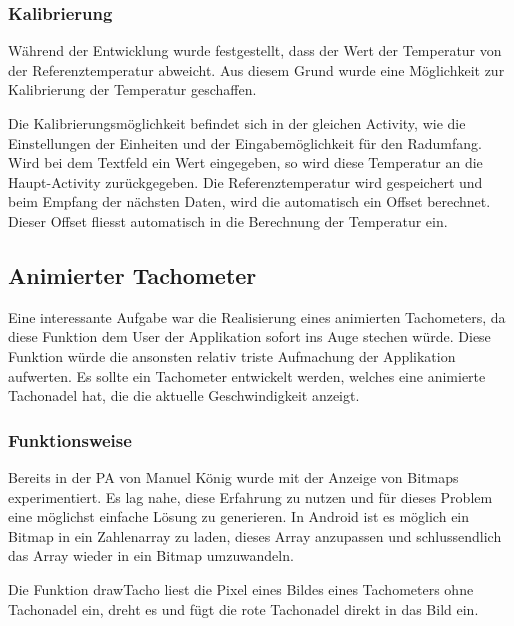 \subsubsection{Kalibrierung}

Während der Entwicklung wurde festgestellt, dass der Wert der Temperatur von der Referenztemperatur abweicht. Aus diesem Grund wurde eine Möglichkeit zur Kalibrierung der Temperatur geschaffen.

Die Kalibrierungsmöglichkeit befindet sich in der gleichen Activity, wie die Einstellungen der Einheiten und der Eingabemöglichkeit für den Radumfang. Wird bei dem Textfeld ein Wert eingegeben, so wird diese Temperatur an die Haupt-Activity zurückgegeben. Die Referenztemperatur wird gespeichert und beim Empfang der nächsten Daten, wird die automatisch ein Offset berechnet. Dieser Offset fliesst automatisch in die Berechnung der Temperatur ein.

\subsection{Animierter Tachometer}

Eine interessante Aufgabe war die Realisierung eines animierten Tachometers, da diese Funktion dem User der Applikation sofort ins Auge stechen würde. Diese Funktion würde die ansonsten relativ triste Aufmachung der Applikation aufwerten. Es sollte ein Tachometer entwickelt werden, welches eine animierte Tachonadel hat, die die aktuelle Geschwindigkeit anzeigt.

\subsubsection{Funktionsweise}

Bereits in der PA von Manuel König wurde mit der Anzeige von Bitmaps experimentiert. Es lag nahe, diese Erfahrung zu nutzen und für dieses Problem eine möglichst einfache Lösung zu generieren. In Android ist es möglich ein Bitmap in ein Zahlenarray zu laden, dieses Array anzupassen und schlussendlich das Array wieder in ein Bitmap umzuwandeln.

Die Funktion drawTacho liest die Pixel eines Bildes eines Tachometers ohne Tachonadel ein, dreht es und fügt die rote Tachonadel direkt in das Bild ein.


